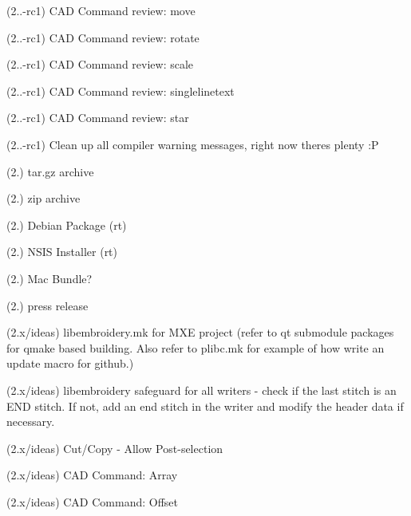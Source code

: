 \begin{DoxyRefList}
\label{todo__todo000266}%
%
(2..-\/rc1) CAD Command review\+: move

\label{todo__todo000268}%
%
(2..-\/rc1) CAD Command review\+: rotate

\label{todo__todo000269}%
%
(2..-\/rc1) CAD Command review\+: scale

\label{todo__todo000270}%
%
(2..-\/rc1) CAD Command review\+: singlelinetext

\label{todo__todo000271}%
%
(2..-\/rc1) CAD Command review\+: star

\label{todo__todo000272}%
%
(2..-\/rc1) Clean up all compiler warning messages, right now theres plenty \+:P

\label{todo__todo000273}%
%
(2.) tar.\+gz archive

\label{todo__todo000274}%
%
(2.) zip archive

\label{todo__todo000275}%
%
(2.) Debian Package (rt)

\label{todo__todo000276}%
%
(2.) NSIS Installer (rt)

\label{todo__todo000277}%
%
(2.) Mac Bundle?

\label{todo__todo000278}%
%
(2.) press release

\label{todo__todo000279}%
%
(2.\+x/ideas) libembroidery.\+mk for MXE project (refer to qt submodule packages for qmake based building. Also refer to plibc.\+mk for example of how write an update macro for github.)

\label{todo__todo000280}%
%
(2.\+x/ideas) libembroidery safeguard for all writers -\/ check if the last stitch is an END stitch. If not, add an end stitch in the writer and modify the header data if necessary.

\label{todo__todo000281}%
%
(2.\+x/ideas) Cut/\+Copy -\/ Allow Post-\/selection

\label{todo__todo000282}%
%
(2.\+x/ideas) CAD Command\+: Array

\label{todo__todo000283}%
%
(2.\+x/ideas) CAD Command\+: Offset


\end{DoxyRefList}
